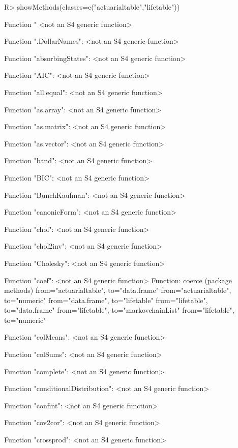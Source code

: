 \documentclass[nojss]{jss}
\begin{document}
\begin{Schunk}
\begin{Sinput}
R> showMethods(classes=c("actuarialtable","lifetable"))
\end{Sinput}
\begin{Soutput}
Function "%
 <not an S4 generic function>

Function ".DollarNames":
 <not an S4 generic function>

Function "absorbingStates":
 <not an S4 generic function>

Function "AIC":
 <not an S4 generic function>

Function "all.equal":
 <not an S4 generic function>

Function "as.array":
 <not an S4 generic function>

Function "as.matrix":
 <not an S4 generic function>

Function "as.vector":
 <not an S4 generic function>

Function "band":
 <not an S4 generic function>

Function "BIC":
 <not an S4 generic function>

Function "BunchKaufman":
 <not an S4 generic function>

Function "canonicForm":
 <not an S4 generic function>

Function "chol":
 <not an S4 generic function>

Function "chol2inv":
 <not an S4 generic function>

Function "Cholesky":
 <not an S4 generic function>

Function "coef":
 <not an S4 generic function>
Function: coerce (package methods)
from="actuarialtable", to="data.frame"
from="actuarialtable", to="numeric"
from="data.frame", to="lifetable"
from="lifetable", to="data.frame"
from="lifetable", to="markovchainList"
from="lifetable", to="numeric"


Function "colMeans":
 <not an S4 generic function>

Function "colSums":
 <not an S4 generic function>

Function "complete":
 <not an S4 generic function>

Function "conditionalDistribution":
 <not an S4 generic function>

Function "confint":
 <not an S4 generic function>

Function "cov2cor":
 <not an S4 generic function>

Function "crossprod":
 <not an S4 generic function>


\end{Soutput}
\end{Schunk}
\end{document}
